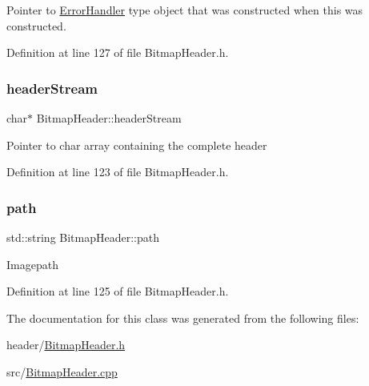 Pointer to \mbox{\hyperlink{classErrorHandler}{Error\+Handler}} type object that was constructed when this was constructed. 

Definition at line 127 of file Bitmap\+Header.\+h.

\mbox{\label{classBitmapHeader_a9109a897251733f77942008318482426}} 
\subsubsection{\texorpdfstring{headerStream}{headerStream}}
{\footnotesize\ttfamily char$\ast$ Bitmap\+Header\+::header\+Stream\hspace{0.3cm}{\ttfamily [private]}}

Pointer to char array containing the complete header 

Definition at line 123 of file Bitmap\+Header.\+h.

\mbox{\label{classBitmapHeader_a928111fbaf59eebf24b750cbca11c5dd}} 
\subsubsection{\texorpdfstring{path}{path}}
{\footnotesize\ttfamily std\+::string Bitmap\+Header\+::path\hspace{0.3cm}{\ttfamily [private]}}

Imagepath 

Definition at line 125 of file Bitmap\+Header.\+h.



The documentation for this class was generated from the following files\+:\begin{DoxyCompactItemize}
\item 
header/\mbox{\hyperlink{BitmapHeader_8h}{Bitmap\+Header.\+h}}\item 
src/\mbox{\hyperlink{BitmapHeader_8cpp}{Bitmap\+Header.\+cpp}}\end{DoxyCompactItemize}
